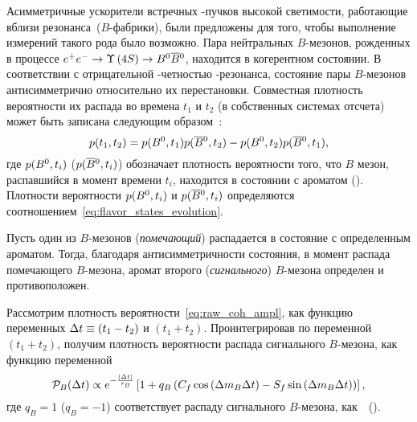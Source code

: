 Асимметричные ускорители встречных \ep-пучков высокой светимости, работающие вблизи резонанса~\ups ($B$-фабрики), были предложены для того, чтобы выполнение измерений такого рода было возможно.  Пара нейтральных $B$-мезонов, рожденных в процессе $e^+e^-\to\Upsilon\left(4S\right)\to B^0\overline{B}{}^0$, находится в когерентном состоянии.  В соответствии с отрицательной \cconj-четностью \ups-резонанса, состояние пары $B$-мезонов антисимметрично относительно их перестановки.  Совместная плотность вероятности их распада во времена $t_1$ и $t_2$ (в собственных системах отсчета) может быть записана следующим образом~\cite{BaBarBook}:
\begin{equation}\label{eq:raw_coh_ampl}
 p(t_1,t_2) = p(B^0,t_1)p(\overline{B}{}^0,t_2) - p(B^0,t_2)p(\overline{B}{}^0,t_1),
\end{equation}
где $p(B^0, t_i)$ ($p(\overline{B}{}^0, t_i)$) обозначает плотность вероятности того, что $B$ мезон, распавшийся в момент времени $t_i$, находится в состоянии с ароматом \bn (\bnbar). Плотности вероятности $p(B^0,t_i)$ и $p(\overline{B}{}^0,t_i)$ определяются соотношением~\eqref{eq:flavor_states_evolution}.  

Пусть один из $B$-мезонов (\emph{помечающий}) распадается в состояние с определенным ароматом.  Тогда, благодаря антисимметричности состояния, в момент распада помечающего $B$-мезона, аромат второго (\emph{сигнального}) $B$-мезона определен и противоположен.

Рассмотрим плотность вероятности~\eqref{eq:raw_coh_ampl}, как функцию переменных $\Delta t\equiv (t_1 - t_2)$ и $(t_1+t_2)$. Проинтегрировав по переменной $(t_1+t_2)$, получим плотность вероятности распада сигнального $B$-мезона, как функцию переменной \dt
\begin{equation}\label{eq:time-dep-pb-tag}
 \mathcal{P}_B(\Delta t) \propto e^{-\frac{\left|\Delta t\right|}{\tau_B}}\left[1 + q_B\left(C_f\cos{\ensuremath{\left(\Delta m_B\Delta t\right)}}-S_f\sin{\ensuremath{\left(\Delta m_B\Delta t\right)}}\right)\right],
\end{equation}
где $q_B=1$ ($q_B=-1$) соответствует распаду сигнального $B$-мезона, как~\bn~(\bnbar).

